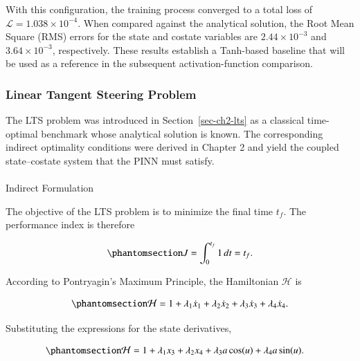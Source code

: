 \documentclass[
  number,
  preprint]{elsarticle}
\makeatletter
\let\oldparagraph\paragraph
\renewcommand{\paragraph}{
    \@ifstar
      \xxxParagraphStar
      \xxxParagraphNoStar
  }
\newcommand{\xxxParagraphStar}[1]{\oldparagraph*{#1}\mbox{}}
\newcommand{\xxxParagraphNoStar}[1]{\oldparagraph{#1}\mbox{}}
\makeatother
\begin{document}
With this configuration, the training process converged to a total loss
of \(\mathcal{L} = 1.038 \times 10^{-4}\). When compared against the
analytical solution, the Root Mean Square (RMS) errors for the state and
costate variables are \(2.44 \times 10^{-3}\) and
\(3.64 \times 10^{-3}\), respectively. These results establish a
Tanh-based baseline that will be used as a reference in the subsequent
activation-function comparison.

\subsubsection{Linear Tangent Steering
Problem}\label{linear-tangent-steering-problem}

The LTS problem was introduced in Section~\ref{sec-ch2-lts} as a
classical time-optimal benchmark whose analytical solution is known. The
corresponding indirect optimality conditions were derived in Chapter 2
and yield the coupled state--costate system that the PINN must satisfy.

\paragraph{Indirect Formulation}\label{indirect-formulation}

The objective of the LTS problem is to minimize the final time \(t_f\).
The performance index is therefore

\begin{equation}\protect\phantomsection\label{eq-ch3-lts-objective}{
J = \int_{0}^{t_f} 1 \, dt = t_f.
}\end{equation}

According to Pontryagin's Maximum Principle, the Hamiltonian
\(\mathcal{H}\) is

\begin{equation}\protect\phantomsection\label{eq-ch3-lts-hamiltonian}{
\mathcal{H} = 1 + \lambda_1 \dot{x}_1 + \lambda_2 \dot{x}_2 + \lambda_3 \dot{x}_3 + \lambda_4 \dot{x}_4.
}\end{equation}

Substituting the expressions for the state derivatives,

\begin{equation}\protect\phantomsection\label{eq-ch3-lts-hamiltonian-sub}{
\begin{aligned}
\mathcal{H} &= 1 + \lambda_1 x_3 + \lambda_2 x_4 + \lambda_3 a \cos(u) + \lambda_4 a \sin(u).
\end{aligned}
}\end{equation}
\end{document}
